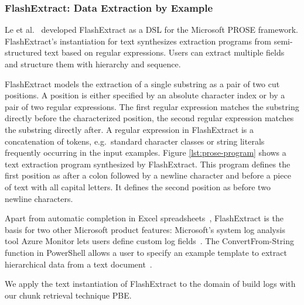 
\subsubsection{FlashExtract: Data Extraction by Example}
Le et al.~\cite{le2014flashextract:} developed FlashExtract as a DSL for the Microsoft PROSE framework.
FlashExtract's instantiation for text synthesizes extraction programs from semi-structured text based on regular expressions.
Users can extract multiple fields and structure them with hierarchy and sequence.

FlashExtract models the extraction of a single substring as a pair of two cut positions.
A position is either specified by an absolute character index or by a pair of two regular expressions.
The first regular expression matches the substring directly before the characterized position, the second regular expression matches the substring directly after.
A regular expression in FlashExtract is a concatenation of tokens, e.g.\ standard character classes or string literals frequently occurring in the input examples.
Figure \ref{lst:prose-program} shows a text extraction program synthesized by FlashExtract.
This program defines the first position as after a colon followed by a newline character and before a piece of text with all capital letters.
It defines the second position as before two newline characters.

Apart from automatic completion in Excel spreadsheets~\cite{excel2019flashfill}, FlashExtract is the basis for two other Microsoft product features:
Microsoft's system log analysis tool Azure Monitor lets users define custom log fields~\cite{azure2019custom}.
The ConvertFrom-String function in PowerShell allows a user to specify an example template to extract hierarchical data from a text document~\cite{powershell2019convert}.

We apply the text instantiation of FlashExtract to the domain of build logs with our chunk retrieval technique PBE\@.

